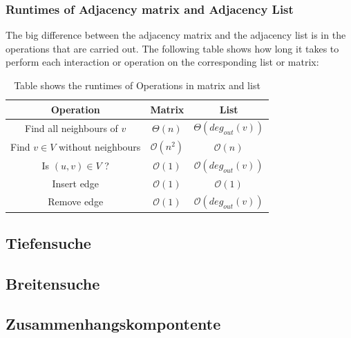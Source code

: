 \documentclass[a4paper]{article}
\begin{document}
\subsubsection{Runtimes of Adjacency matrix and Adjacency List}
The big difference between the adjacency matrix and the adjacency list is in the operations that are carried out. The following table shows how long it takes to perform each interaction or operation on the corresponding list or matrix:
   \begin{table}[h]
        \centering
        \begin{tabular}{c|c|c}
            \textbf{Operation}    & 
            \textbf{Matrix}    & 
            \textbf{List}    \\
     
            \hline
            Find all neighbours of $v$ &
            $\Theta(n)$ &
            $\Theta(deg_{out}(v))$ \\

            Find $v \in V$ without neighbours &
            $\mathcal{O}(n^2)$ &
            $\mathcal{O}(n)$ \\

            Is $(u,v) \in V$ ?&
            $\mathcal{O}(1)$ &
            $\mathcal{O}(deg_{out}(v))$ \\

            Insert edge &
            $\mathcal{O}(1)$ &
            $\mathcal{O}(1)$ \\

            Remove edge &
            $\mathcal{O}(1)$ &
            $\mathcal{O}(deg_{out}(v))$ \\

        \end{tabular}
        \caption{Table shows the runtimes of Operations in matrix and list}
        \label{tab:RuntimesMatrix and List}
    \end{table}

\subsection{Tiefensuche}

\subsection{Breitensuche}
    
\subsection{Zusammenhangskompontente}
    
\end{document}
